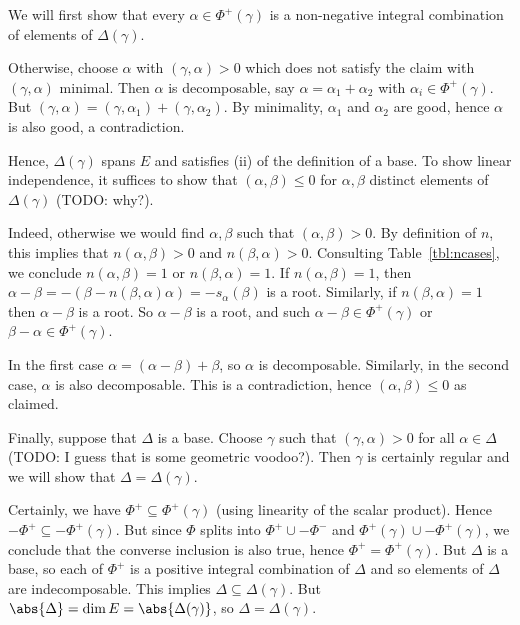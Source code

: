We will first show that every $\alpha \in \Phi^+(\gamma)$ is a non-negative integral
combination of elements of $\Delta(\gamma)$.

Otherwise, choose $\alpha$ with $(\gamma, \alpha) > 0$ which does not satisfy
the claim with $(\gamma, \alpha)$ minimal.
Then $\alpha$ is decomposable, say $\alpha = \alpha_1 + \alpha_2$ with
$\alpha_i \in \Phi^+(\gamma)$. But $(\gamma, \alpha) = (\gamma, \alpha_1) + (\gamma, \alpha_2)$.
By minimality, $\alpha_1$ and $\alpha_2$ are good, hence $\alpha$ is also good,
a contradiction.

Hence, $\Delta(\gamma)$ spans $E$ and satisfies (ii) of the definition of a base.
To show linear independence, it suffices to show that $(\alpha, \beta) \leq 0$
for $\alpha, \beta$ distinct elements of $\Delta(\gamma)$ (TODO: why?).

Indeed, otherwise we would find
$\alpha, \beta$ such that
$(\alpha, \beta) > 0$. By definition of $n$, this implies that
$n(\alpha, \beta) > 0$ and $n(\beta, \alpha) > 0$. Consulting Table~\ref{tbl:ncases},
we conclude
$n(\alpha, \beta) = 1$ or $n(\beta, \alpha) = 1$.
If $n(\alpha, \beta) = 1$, then $\alpha - \beta = -(\beta - n(\beta, \alpha) \alpha) = -s_{\alpha}(\beta)$ is
a root. Similarly, if $n(\beta, \alpha) = 1$ then $\alpha - \beta$ is a root.
So $\alpha - \beta$ is a root, and such $\alpha - \beta \in \Phi^+(\gamma)$ or
$\beta - \alpha \in \Phi^+(\gamma)$.

In the first case $\alpha = (\alpha - \beta) + \beta$, so $\alpha$ is
decomposable. Similarly, in the second case, $\alpha$ is also decomposable. This
is a contradiction, hence $(\alpha, \beta)\leq 0$ as claimed.

Finally, suppose that  $\Delta$ is a base. Choose $\gamma$ such that
$(\gamma, \alpha) > 0$ for all $\alpha \in \Delta$ (TODO: I guess that is some
geometric voodoo?). Then $\gamma$ is certainly regular and we will show that
$\Delta = \Delta(\gamma)$.

Certainly, we have $\Phi^+ \subseteq \Phi^+(\gamma)$ (using linearity of the
scalar product). Hence $-\Phi^+ \subseteq -\Phi^+(\gamma)$. But since $\Phi$
splits into $\Phi^+ \cup -\Phi^-$ and $\Phi^+(\gamma) \cup -\Phi^+(\gamma)$,
we conclude that the converse inclusion is also true, hence $\Phi^+ = \Phi^+(\gamma)$.
But $\Delta$ is a base, so each of $\Phi^+$ is a positive integral combination
of $\Delta$ and so elements of $\Delta$ are indecomposable. This implies
 $\Delta \subseteq \Delta(\gamma)$. But $\abs{\Delta} = \dim E = \abs{\Delta(\gamma)}$,
 so $\Delta = \Delta(\gamma)$.
